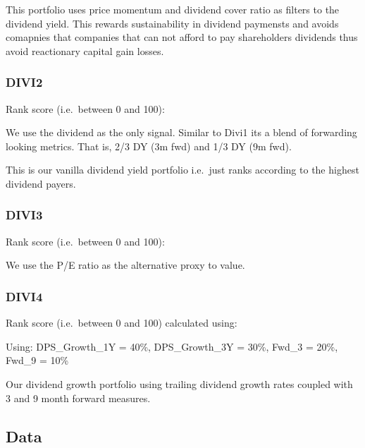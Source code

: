 \documentclass[10pt,preprint, authoryear]{elsarticle}
\numberwithin{equation}{section}
\numberwithin{figure}{section}
\numberwithin{table}{section}
\begin{document}
This portfolio uses price momentum and dividend cover ratio as filters
to the dividend yield. This rewards sustainability in dividend paymensts
and avoids comapnies that companies that can not afford to pay
shareholders dividends thus avoid reactionary capital gain losses.

\hypertarget{divi2}{%
\subsubsection*{DIVI2}\label{divi2}}

Rank score (i.e.~between 0 and 100):

We use the dividend as the only signal. Similar to Divi1 its a blend of
forwarding looking metrics. That is, 2/3 DY (3m fwd) and 1/3 DY (9m
fwd).

This is our vanilla dividend yield portfolio i.e.~just ranks according
to the highest dividend payers.

\hypertarget{divi3}{%
\subsubsection*{DIVI3}\label{divi3}}

Rank score (i.e.~between 0 and 100):

We use the P/E ratio as the alternative proxy to value.

\hypertarget{divi4}{%
\subsubsection*{DIVI4}\label{divi4}}

Rank score (i.e.~between 0 and 100) calculated using:

Using: DPS\_Growth\_1Y = 40\%, DPS\_Growth\_3Y = 30\%, Fwd\_3 = 20\%,
Fwd\_9 = 10\%

Our dividend growth portfolio using trailing dividend growth rates
coupled with 3 and 9 month forward measures.

\hypertarget{data}{%
\subsection*{Data}\label{data}}
\end{document}
